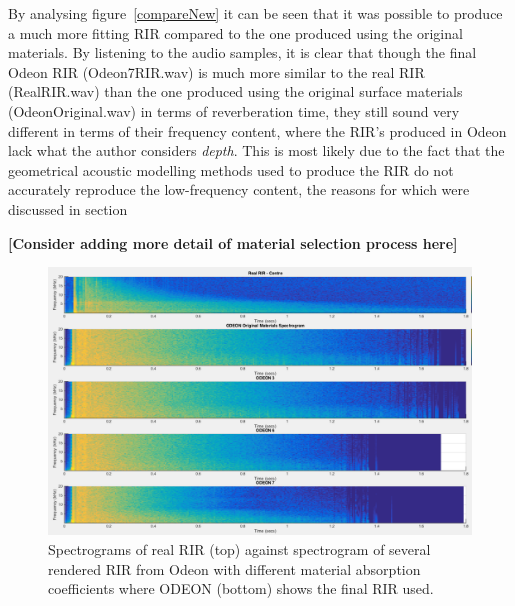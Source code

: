\documentclass[../../main.tex]{subfiles}
\begin{document}
			By analysing figure~\ref{compareNew} it can be seen that it was possible to produce a much more fitting \ac{RIR} compared to the one produced using the original materials. By listening to the audio samples, it is clear that though the final Odeon RIR (Odeon7RIR.wav) is much more similar to the real \ac{RIR} (RealRIR.wav) than the one produced using the original surface materials (OdeonOriginal.wav) in terms of reverberation time, they still sound very different in terms of their frequency content, where the \ac{RIR}'s produced in Odeon lack what the author considers \textit{depth}. This is most likely due to the fact that the geometrical acoustic modelling methods used to produce the \ac{RIR} do not accurately reproduce the low-frequency content, the reasons for which were discussed in section~

			\begin{center}
				\textbf{[Consider adding more detail of material selection process here]}
			\end{center}

			\begin{figure}[H]
				\centerline{\includegraphics[scale = 0.4]{Sections/Implementation/Odeon/images/MaterialCompare/OriginalMaterials/all.png}}
				\caption{Spectrograms of real \ac{RIR} (top) against spectrogram of several rendered \ac{RIR} from Odeon with different material absorption coefficients where ODEON  (bottom) shows the final \ac{RIR} used.}
				\label{compareAll}
			\end{figure}
\end{document}
